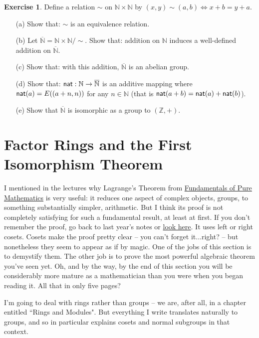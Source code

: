 \documentclass[11pt]{amsbook}
\theoremstyle{definition}
\newtheorem{exercise}{Exercise}
\begin{document}
\begin{exercise}
Define a relation $\sim$ on $\mathbb{N}\times \mathbb{N}$ by $(x,y)\sim (a,b) \Leftrightarrow x+b = y+a$.
\begin{enumerate}
\item[(a)] Show that: $\sim$ is an equivalence relation.
\item[(b)] Let $\overline{\mathbb{N}} = \mathbb{N}\times \mathbb{N} / \!\!\sim$. Show that: addition on $\mathbb{N}$ induces a well-defined addition on $\overline{\mathbb{N}}$.
\item[(c)] Show that: with this addition, $\overline{\mathbb{N}}$ is an abelian group.
\item[(d)] Show that: ${\sf nat}: \mathbb{N}\to \overline{\mathbb{N}}$ is an additive mapping where ${\sf nat} (a) = E((a+n,n))$ for any $n\in \mathbb{N}$ (that is ${\sf nat}( a + b) = {\sf nat}(a) + {\sf nat}(b)$).
\item[(e)] Show that $\overline{\mathbb{N}}$ is isomorphic as a group to $(\mathbb{Z}, +)$.
\end{enumerate}
\end{exercise}


\section{Factor Rings and the First Isomorphism Theorem}
\label{FRFIT}
I mentioned in the lectures why Lagrange's Theorem from \href{http://www.drps.ed.ac.uk/12-13/dpt/cxmath08064.htm}{Fundamentals of Pure Mathematics} is very useful: it reduces one aspect of complex objects, groups, to something substantially simpler, arithmetic. But I think its proof is not completely satisfying for such a fundamental result, at least at first. If you don't remember the proof, go back to last year's notes or \href{http://en.wikipedia.org/wiki/Lagrange's_theorem_(group_theory)#Proof_of_Lagrange.27s_Theorem}{look here}. It uses left or right cosets. Cosets make the proof pretty clear -- you can't forget it...right? -- but nonetheless they seem to appear as if by magic. One of the jobs of this section is to demystify them. The other job is to prove the most powerful algebraic theorem you've seen yet. Oh, and by the way, by the end of this section you will be considerably more mature as a mathematician than you were when you began reading it. All that in only five pages?
\medskip

I'm going to deal with rings rather than groups -- we are, after all, in a chapter entitled ``Rings and Modules". But everything I write translates naturally to groups, and so in particular explains cosets and normal subgroups in that context.
\medskip
\end{document}
